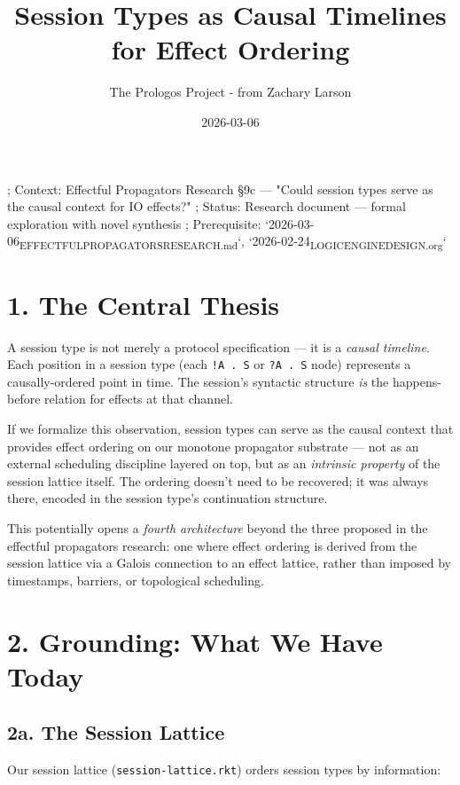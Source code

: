 \documentclass[11pt]{article}
\author{The Prologos Project - from Zachary Larson}
\date{2026-03-06}
\title{Session Types as Causal Timelines for Effect Ordering}
\begin{document}
\maketitle
\tableofcontents

; Context: Effectful Propagators Research §9c — "Could session types serve as the causal context for IO effects?"
; Status: Research document — formal exploration with novel synthesis
; Prerequisite: `2026-03-06\textsubscript{EFFECTFUL}\textsubscript{PROPAGATORS}\textsubscript{RESEARCH.md}`, `2026-02-24\textsubscript{LOGIC}\textsubscript{ENGINE}\textsubscript{DESIGN.org}`
\section{1. The Central Thesis}
\label{sec:org50ad62b}

A session type is not merely a protocol specification — it is a \emph{causal timeline}.
Each position in a session type (each \texttt{!A . S} or \texttt{?A . S} node) represents a
causally-ordered point in time. The session's syntactic structure \emph{is} the
happens-before relation for effects at that channel.

If we formalize this observation, session types can serve as the causal context
that provides effect ordering on our monotone propagator substrate — not as an
external scheduling discipline layered on top, but as an \emph{intrinsic property}
of the session lattice itself. The ordering doesn't need to be recovered; it
was always there, encoded in the session type's continuation structure.

This potentially opens a \emph{fourth architecture} beyond the three proposed in
the effectful propagators research: one where effect ordering is derived from
the session lattice via a Galois connection to an effect lattice, rather than
imposed by timestamps, barriers, or topological scheduling.
\section{2. Grounding: What We Have Today}
\label{sec:org58e48fc}

\subsection{2a. The Session Lattice}
\label{sec:org801b377}

Our session lattice (\texttt{session-lattice.rkt}) orders session types by information:
\end{document}
